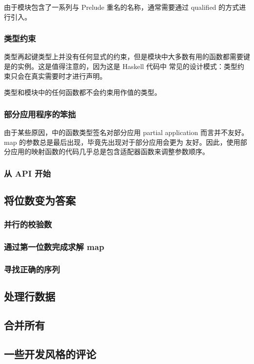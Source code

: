 \documentclass[./main.tex]{subfiles}
\begin{document}
由于模块包含了一系列与 Prelude 重名的名称，通常需要通过 qualified 的方式进行引入。

\subsubsection*{类型约束}

类型再起键类型上并没有任何显式的约束，但是模块中大多数有用的函数都需要键是的实例。这是值得注意的，因为这是 Haskell 代码中
常见的设计模式：类型约束只会在真实需要时才进行声明。

类型和模块中的任何函数都不会约束用作值的类型。

\subsubsection*{部分应用程序的笨拙}

由于某些原因，中的函数类型签名对部分应用 partial application 而言并不友好。map 的参数总是最后出现，毕竟先出现对于部分应用会更为
友好。因此，使用部分应用的映射函数的代码几乎总是包含适配器函数来调整参数顺序。

\subsubsection*{从 API 开始}

\subsection*{将位数变为答案}

\subsubsection*{并行的校验数}

\subsubsection*{通过第一位数完成求解 map}

\subsubsection*{寻找正确的序列}

\subsection*{处理行数据}

\subsection*{合并所有}

\subsection*{一些开发风格的评论}
\end{document}
